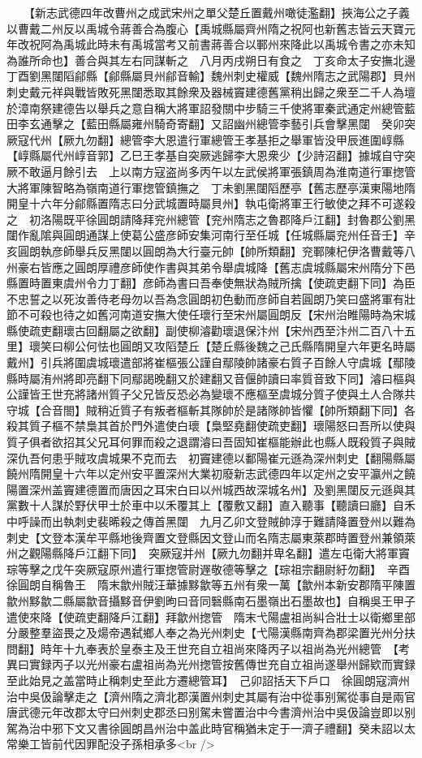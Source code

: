 　　【新志武德四年改曹州之成武宋州之單父楚丘置戴州噉徒濫翻】挾海公之子義以曹戴二州反以禹城令蔣善合為腹心【禹城縣屬齊州隋之祝阿也新舊志皆云天寶元年改祝阿為禹城此時未有禹城當考又前書蔣善合以鄆州來降此以禹城令書之亦未知為誰所命也】善合與其左右同謀斬之　八月丙戌朔日有食之　丁亥命太子安撫北邊　丁酉劉黑闥䧟鄃縣【鄃縣屬貝州鄃音輸】魏州刺史權威【魏州隋志之武陽郡】貝州刺史戴元祥與戰皆敗死黑闥悉取其餘衆及器械竇建德舊黨稍出歸之衆至二千人為壇於漳南祭建德告以舉兵之意自稱大將軍詔發關中步騎三千使將軍秦武通定州總管藍田李玄通擊之【藍田縣屬雍州騎奇寄翻】又詔幽州總管李藝引兵會擊黑闥　癸卯突厥寇代州【厥九勿翻】總管李大恩遣行軍總管王孝基拒之舉軍皆没甲辰進圍崞縣【崞縣屬代州崞音郭】乙巳王孝基自突厥逃歸李大恩衆少【少詩沼翻】據城自守突厥不敢逼月餘引去　上以南方寇盗尚多丙午以左武侯將軍張鎮周為淮南道行軍揔管大將軍陳智略為嶺南道行軍揔管鎮撫之　丁未劉黑闥䧟歷亭【舊志歷亭漢東陽地隋開皇十六年分鄃縣置隋志曰分武城置時屬貝州】執屯衛將軍王行敏使之拜不可遂殺之　初洛陽既平徐圓朗請降拜兖州總管【兖州隋志之魯郡降戶江翻】封魯郡公劉黑闥作亂隂與圓朗通謀上使葛公盛彦師安集河南行至任城【任城縣屬兖州任音壬】辛亥圓朗執彦師舉兵反黑闥以圓朗為大行臺元帥【帥所類翻】兖鄆陳杞伊洛曹戴等八州豪右皆應之圓朗厚禮彦師使作書與其弟令舉虞城降【舊志虞城縣屬宋州隋分下邑縣置時置東虞州令力丁翻】彦師為書曰吾奉使無狀為賊所擒【使疏吏翻下同】為臣不忠誓之以死汝善侍老母勿以吾為念圓朗初色動而彦師自若圓朗乃笑曰盛將軍有壯節不可殺也待之如舊河南道安撫大使任瓌行至宋州屬圓朗反【宋州治睢陽時為宋城縣使疏吏翻瓌古回翻屬之欲翻】副使柳濬勸瓌退保汴州【宋州西至汴州二百八十五里】瓌笑曰柳公何怯也圓朗又攻䧟楚丘【楚丘縣後魏之己氏縣隋開皇六年更名時屬戴州】引兵將圍虞城瓌遣部將崔樞張公謹自鄢陵帥諸豪右質子百餘人守虞城【鄢陵縣時屬洧州將即亮翻下同鄢謁晚翻又於建翻又音偃帥讀曰率質音致下同】濬曰樞與公謹皆王世充將諸州質子父兄皆反恐必為變瓌不應樞至虞城分質子使與土人合隊共守城【合音閤】賊稍近質子有叛者樞斬其隊帥於是諸隊帥皆懼【帥所類翻下同】各殺其質子樞不禁梟其首於門外遣使白瓌【梟堅堯翻使疏吏翻】瓌陽怒曰吾所以使與質子俱者欲招其父兄耳何罪而殺之退謂濬曰吾固知崔樞能辦此也縣人既殺質子與賊深仇吾何患乎賊攻虞城果不克而去　初竇建德以鄱陽崔元遜為深州刺史【翻陽縣屬饒州隋開皇十六年以定州安平置深州大業初廢新志武德四年以定州之安平瀛州之饒陽置深州盖竇建德置而唐因之耳宋白曰以州城西故深城名州】及劉黑闥反元遜與其黨數十人謀於野伏甲士於車中以禾覆其上【覆敷又翻】直入聽事【聽讀曰廳】自禾中呼譟而出執刺史裴晞殺之傳首黑闥　九月乙卯文登賊帥淳于難請降置登州以難為刺史【文登本漢牟平縣地後齊置文登縣因文登山而名隋志屬東萊郡時置登州兼領萊州之觀陽縣降戶江翻下同】　突厥寇并州【厥九勿翻并卑名翻】遣左屯衛大將軍竇琮等擊之戊午突厥寇原州遣行軍揔管尉遟敬德等擊之【琮祖宗翻尉紆勿翻】　辛酉徐圓朗自稱魯王　隋末歙州賊汪華據黟歙等五州有衆一萬【歙州本新安郡隋平陳置歙州黟歙二縣屬歙音攝黟音伊劉昫曰音同䃜縣南石墨嶺出石墨故也】自稱吳王甲子遣使來降【使疏吏翻降戶江翻】拜歙州揔管　隋末弋陽盧祖尚糾合壯士以衛鄉里部分嚴整羣盜畏之及煬帝遇弑鄉人奉之為光州刺史【弋陽漢縣南齊為郡梁置光州分扶問翻】時年十九奉表於皇泰主及王世充自立祖尚來降丙子以祖尚為光州總管　【考異曰實録丙子以光州豪右盧祖尚為光州揔管按舊傳世充自立祖尚遂舉州歸欵而實録至此始見之盖當時止稱刺史至此方遷總管耳】　己卯詔括天下戶口　徐圓朗寇濟州治中吳伋論擊走之【濟州隋之濟北郡漢置州刺史其屬有治中從事别駕從事自是兩官唐武德元年改郡太守曰州刺史郡丞曰别駕未嘗置治中今書濟州治中吳伋論豈即以别駕為治中邪下文又書徐圓朗昌州治中盖此時官稱猶未定于一濟子禮翻】癸未詔以太常樂工皆前代因罪配没子孫相承多<br />
